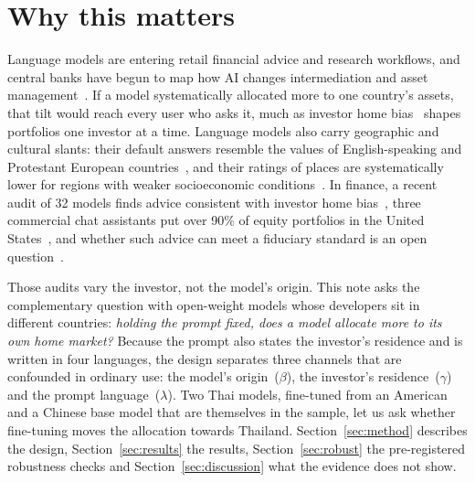 \section{Why this matters}\label{sec:intro}

Language models are entering retail financial advice and research workflows, and central banks have begun to map how AI changes intermediation and asset management~\cite{aldasoro2024,bis2024ai}. If a model systematically allocated more to one country's assets, that tilt would reach every user who asks it, much as investor home bias~\cite{french1991,lewis1999,coval1999} shapes portfolios one investor at a time. Language models also carry geographic and cultural slants: their default answers resemble the values of English-speaking and Protestant European countries~\cite{tao2024,durmus2023}, and their ratings of places are systematically lower for regions with weaker socioeconomic conditions~\cite{manvi2024}. In finance, a recent audit of 32 models finds advice consistent with investor home bias~\cite{fieberg2025}, three commercial chat assistants put over 90\% of equity portfolios in the United States~\cite{winder2025}, and whether such advice can meet a fiduciary standard is an open question~\cite{lo2024}.

Those audits vary the investor, not the model's origin. This note asks the complementary question with open-weight models whose developers sit in different countries: \emph{holding the prompt fixed, does a model allocate more to its own home market?} Because the prompt also states the investor's residence and is written in four languages, the design separates three channels that are confounded in ordinary use: the model's origin~($\beta$), the investor's residence~($\gamma$) and the prompt language~($\lambda$). Two Thai models, fine-tuned from an American and a Chinese base model that are themselves in the sample, let us ask whether fine-tuning moves the allocation towards Thailand. Section~\ref{sec:method} describes the design, Section~\ref{sec:results} the results, Section~\ref{sec:robust} the pre-registered robustness checks and Section~\ref{sec:discussion} what the evidence does not show.
